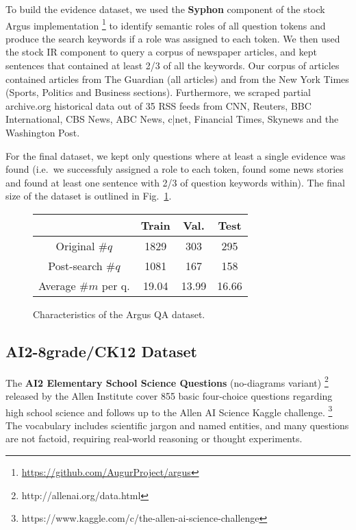 \documentclass[11pt]{article}
\begin{document}
To build the evidence dataset, we used the \textbf{Syphon} component
\cite{argus}
of the stock Argus implementation%
\footnote{\url{https://github.com/AugurProject/argus}}
to identify semantic roles of all question tokens and produce
the search keywords if a role was assigned to each token.
We then used the stock IR component to query a corpus of newspaper
articles, and kept sentences that contained at least 2/3 of all
the keywords.
Our corpus of articles contained articles from The Guardian (all articles) and from the New York Times (Sports, Politics and Business sections).  Furthermore, we scraped partial archive.org historical data out of 35 RSS feeds from CNN, Reuters, BBC International, CBS News, ABC News, c|net, Financial Times, Skynews and the Washington Post.

For the final dataset, we kept only questions where at least
a single evidence was found (i.e.\ we successfuly assigned a role
to each token, found some news stories and found at least one
sentence with 2/3 of question keywords within).  The final size
of the dataset is outlined in Fig.~\ref{tab:dataset}.

\begin{figure}
	\centering
	\begin{tabular}{|c|ccc|}
		\hline
		& Train & Val. & Test \\
		\hline
		Original $\#q$ & 1829 & 303 & 295 \\
		Post-search $\#q$ & 1081 & 167 & 158 \\
		Average $\#m$ per q. & 19.04 & 13.99 & 16.66 \\
		\hline
	\end{tabular}
	\vspace*{-0.2cm}
	\caption{\footnotesize%
		Characteristics of the Argus QA dataset.
	}
	\label{tab:dataset}
\end{figure}


\subsection{AI2-8grade/CK12 Dataset}

The \textbf{AI2 Elementary School Science Questions} (no-diagrams variant)%
\footnote{http://allenai.org/data.html} released by the Allen Institute
cover 855 basic four-choice questions regarding high school science
and follows up to the Allen AI Science Kaggle challenge.%
\footnote{https://www.kaggle.com/c/the-allen-ai-science-challenge}
The vocabulary includes scientific jargon and named entities, and many questions
are not factoid, requiring real-world reasoning or thought experiments.
\end{document}
